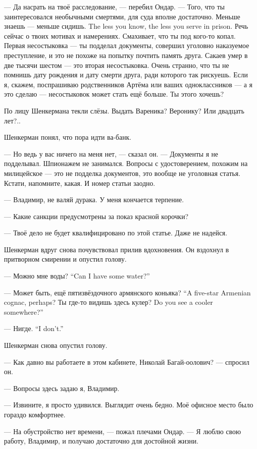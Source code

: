 --- Да насрать на твоё расследование, --- перебил Ондар.
--- Того, что ты заинтересовался необычными смертями, для суда вполне достаточно.
{Меньше знаешь --- меньше сидишь.}
{The less you know, the less you serve in prison.}
Речь сейчас о твоих мотивах и намерениях.
Смахивает, что ты под кого-то копал.
Первая несостыковка --- ты подделал документы, совершил уголовно наказуемое преступление, и это не похоже на попытку почтить память друга.
Сакаев умер в две тысячи шестом --- это вторая несостыковка.
Очень странно, что ты не помнишь дату рождения и дату смерти друга, ради которого так рискуешь.
Если я, скажем, поспрашиваю родственников Артёма или ваших одноклассников --- а я это сделаю --- несостыковок может стать ещё больше.
Ты этого хочешь?

По лицу Шенкермана текли слёзы.
Выдать Вареника?
Веронику?
Или двадцать лет?..

Шенкерман понял, что пора идти ва-банк.

--- Но ведь у вас ничего на меня нет, --- сказал он.
--- Документы я не подделывал.
Шпионажем не занимался.
Вопросы с удостоверением, похожим на милицейское --- это не подделка документов, это вообще не уголовная статья.
Кстати, напомните, какая.
И номер статьи заодно.

--- Владимир, не валяй дурака.
У меня кончается терпение.

--- Какие санкции предусмотрены за показ красной корочки?

--- Твоё дело не будет квалифицировано по этой статье.
Даже не надейся.

Шенкерман вдруг снова почувствовал прилив вдохновения.
Он вздохнул в притворном смирении и опустил голову.

{--- Можно мне воды?}
{``Can I have some water?''}

{--- Может быть, ещё пятизвёздочного армянского коньяка?}
{``A five-star Armenian cognac, perhaps?}
{Ты где-то видишь здесь кулер?}
{Do you see a cooler somewhere?''}

{--- Нигде.}
{``I don't.''}

Шенкерман снова опустил голову.

--- Как давно вы работаете в этом кабинете, Николай Багай-оолович? --- спросил он.

--- Вопросы здесь задаю я, Владимир.

--- Извините, я просто удивился.
Выглядит очень бедно.
Моё офисное место было гораздо комфортнее.

--- На обустройство нет времени, --- пожал плечами Ондар.
--- Я люблю свою работу, Владимир, и получаю достаточно для достойной жизни.

